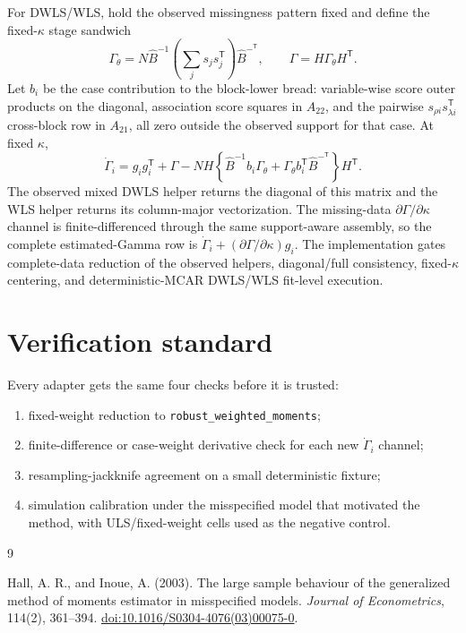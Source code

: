 \documentclass[11pt]{article}
\newcommand{\T}{^{\mathsf T}}
\theoremstyle{plain}
\theoremstyle{remark}
\begin{document}
For DWLS/WLS, hold the observed missingness pattern fixed and define the
fixed-$\kappa$ stage sandwich
\[
  \Gamma_\theta
  =
  N\hat B^{-1}\left(\sum_j s_js_j\T\right)\hat B^{-\T},
  \qquad
  \Gamma = H\Gamma_\theta H\T .
\]
Let $b_i$ be the case contribution to the block-lower bread: variable-wise
score outer products on the diagonal, association score squares in $A_{22}$,
and the pairwise $s_{\rho i}s_{\lambda i}\T$ cross-block row in $A_{21}$, all
zero outside the observed support for that case. At fixed $\kappa$,
\[
  \dot\Gamma_i
  =
  g_i g_i\T + \Gamma
  -
  N H\left\{
    \hat B^{-1}b_i\Gamma_\theta
    + \Gamma_\theta b_i\T\hat B^{-\T}
  \right\}H\T .
\]
The observed mixed DWLS helper returns the diagonal of this matrix and the WLS
helper returns its column-major vectorization. The missing-data
$\partial\Gamma/\partial\kappa$ channel is finite-differenced through the same
support-aware assembly, so the complete estimated-Gamma row is
$\dot\Gamma_i + (\partial\Gamma/\partial\kappa)g_i$. The implementation gates
complete-data reduction of the observed helpers, diagonal/full consistency,
fixed-$\kappa$ centering, and deterministic-MCAR DWLS/WLS fit-level execution.

\section{Verification standard}

Every adapter gets the same four checks before it is trusted:
\begin{enumerate}
\item fixed-weight reduction to \texttt{robust\_weighted\_moments};
\item finite-difference or case-weight derivative check for each new
  $\dot\Gamma_i$ channel;
\item resampling-jackknife agreement on a small deterministic fixture;
\item simulation calibration under the misspecified model that motivated the
  method, with ULS/fixed-weight cells used as the negative control.
\end{enumerate}

\begin{thebibliography}{9}

Hall, A. R., and Inoue, A. (2003). The large sample behaviour of the generalized
method of moments estimator in misspecified models. \emph{Journal of
Econometrics}, 114(2), 361--394.
\href{https://doi.org/10.1016/S0304-4076(03)00075-0}{doi:10.1016/S0304-4076(03)00075-0}.

\end{thebibliography}
\end{document}
